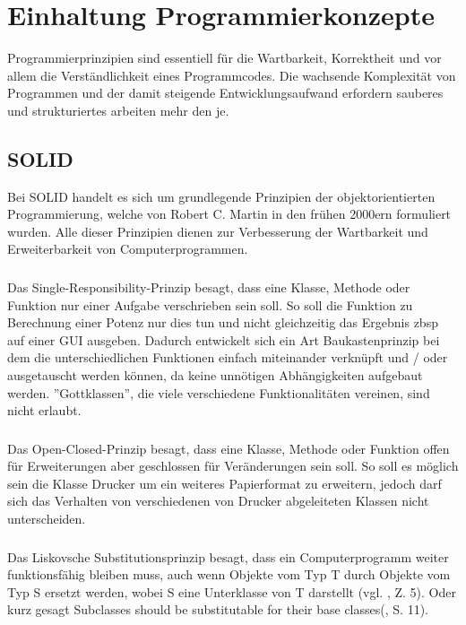 
\section{Einhaltung Programmierkonzepte}

Programmierprinzipien sind essentiell für die Wartbarkeit, Korrektheit und vor allem die Verständlichkeit eines Programmcodes. Die wachsende Komplexität von Programmen und der damit steigende Entwicklungsaufwand erfordern sauberes und strukturiertes arbeiten mehr den je. 


\subsection{SOLID}
Bei SOLID handelt es sich um grundlegende Prinzipien der objektorientierten Programmierung, welche von Robert C. Martin in den frühen 2000ern formuliert wurden.  Alle dieser Prinzipien dienen zur Verbesserung der Wartbarkeit und Erweiterbarkeit von Computerprogrammen. 



\subsubsection{\textPrincipleSingleResponsibility}
\label{\textPrincipleSingleResponsibility}
Das Single-Responsibility-Prinzip besagt, dass eine Klasse, Methode oder Funktion
nur einer Aufgabe verschrieben sein soll. So soll die Funktion zu Berechnung einer
Potenz nur dies tun und nicht gleichzeitig das Ergebnis zbsp auf einer GUI ausgeben.
Dadurch entwickelt sich ein Art Baukastenprinzip bei dem die unterschiedlichen 
Funktionen einfach miteinander verknüpft und / oder ausgetauscht werden können, da
keine unnötigen Abhängigkeiten aufgebaut werden. ''Gottklassen'', die viele
verschiedene Funktionalitäten vereinen, sind nicht erlaubt.

\subsubsection{\textPrincipleOpenClosed}
\label{\textPrincipleOpenClosed}
Das Open-Closed-Prinzip besagt, dass eine Klasse, Methode oder Funktion offen
für Erweiterungen aber geschlossen für Veränderungen sein soll. So soll es möglich
sein die Klasse Drucker um ein weiteres Papierformat zu erweitern, jedoch darf sich
das Verhalten von verschiedenen von Drucker abgeleiteten Klassen nicht unterscheiden.

\subsubsection{\textPrincipleLiskovSubstitution}
\label{\textPrincipleLiskovSubstitution}
Das Liskovsche Substitutionsprinzip besagt, dass ein Computerprogramm weiter funktionsfähig bleiben muss, auch wenn Objekte vom Typ T durch Objekte vom Typ S ersetzt werden, wobei S eine Unterklasse von T darstellt (vgl. \cite{wiki:lsp}, Z. 5). Oder kurz gesagt \glqq Subclasses should be substitutable for their base classes\grqq(\cite{knoernschild2002java}, S. 11).

